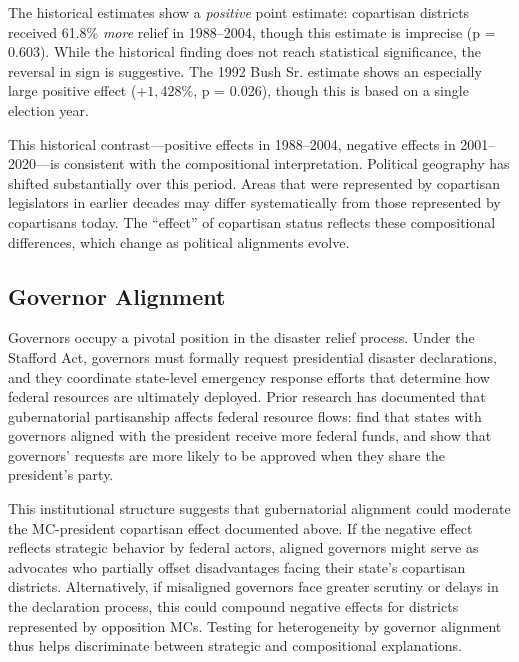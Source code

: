 \documentclass[12pt,letterpaper,oneside]{book}
\newcommand{\basepath}{g:/My Drive/Grad School}
\newcommand{\basepath}{basepath}
\begin{document}


The historical estimates show a \emph{positive} point estimate: copartisan districts received 61.8\% \emph{more} relief in 1988--2004, though this estimate is imprecise (p = 0.603). While the historical finding does not reach statistical significance, the reversal in sign is suggestive. The 1992 Bush Sr. estimate shows an especially large positive effect ($+1,428\%$, p = 0.026), though this is based on a single election year.

This historical contrast---positive effects in 1988--2004, negative effects in 2001--2020---is consistent with the compositional interpretation. Political geography has shifted substantially over this period. Areas that were represented by copartisan legislators in earlier decades may differ systematically from those represented by copartisans today. The ``effect'' of copartisan status reflects these compositional differences, which change as political alignments evolve.

\subsection{Governor Alignment}

Governors occupy a pivotal position in the disaster relief process. Under the Stafford Act, governors must formally request presidential disaster declarations, and they coordinate state-level emergency response efforts that determine how federal resources are ultimately deployed. Prior research has documented that gubernatorial partisanship affects federal resource flows: \cite{larcinese2006allocating} find that states with governors aligned with the president receive more federal funds, and \cite{reeves2011political} show that governors' requests are more likely to be approved when they share the president's party.

This institutional structure suggests that gubernatorial alignment could moderate the MC-president copartisan effect documented above. If the negative effect reflects strategic behavior by federal actors, aligned governors might serve as advocates who partially offset disadvantages facing their state's copartisan districts. Alternatively, if misaligned governors face greater scrutiny or delays in the declaration process, this could compound negative effects for districts represented by opposition MCs. Testing for heterogeneity by governor alignment thus helps discriminate between strategic and compositional explanations.
\end{document}

